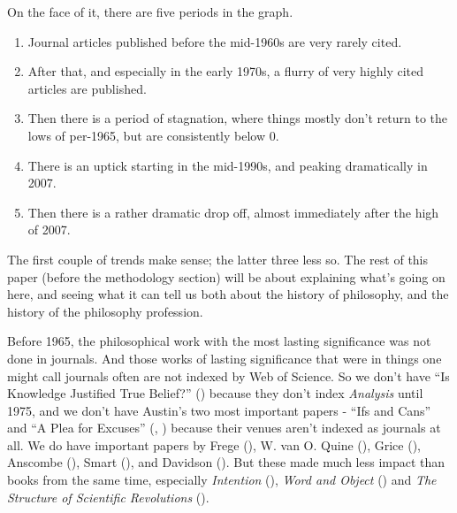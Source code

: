 \documentclass[
  12pt,
  letterpaper,
  DIV=11,
  numbers=noendperiod]{scrartcl}
\providecommand{\tightlist}{%
  \setlength{\itemsep}{0pt}\setlength{\parskip}{0pt}}
\begin{document}
On the face of it, there are five periods in the graph.

\begin{enumerate}
\def\labelenumi{\arabic{enumi}.}
\tightlist
\item
  Journal articles published before the mid-1960s are very rarely cited.
\item
  After that, and especially in the early 1970s, a flurry of very highly
  cited articles are published.
\item
  Then there is a period of stagnation, where things mostly don't return
  to the lows of per-1965, but are consistently below 0.
\item
  There is an uptick starting in the mid-1990s, and peaking dramatically
  in 2007.
\item
  Then there is a rather dramatic drop off, almost immediately after the
  high of 2007.
\end{enumerate}

The first couple of trends make sense; the latter three less so. The
rest of this paper (before the methodology section) will be about
explaining what's going on here, and seeing what it can tell us both
about the history of philosophy, and the history of the philosophy
profession.

Before 1965, the philosophical work with the most lasting significance
was not done in journals. And those works of lasting significance that
were in things one might call journals often are not indexed by Web of
Science. So we don't have ``Is Knowledge Justified True Belief?''
() because they don't index
\emph{Analysis} until 1975, and we don't have Austin's two most
important papers - ``Ifs and Cans'' and ``A Plea for Excuses''
(,
) because their venues aren't indexed
as journals at all. We do have important papers by Frege
(), W. van O. Quine
(), Grice
(), Anscombe
(), Smart
(), and Davidson
(). But these made much less
impact than books from the same time, especially \emph{Intention}
(), \emph{Word and Object}
() and \emph{The Structure
of Scientific Revolutions} ().
\end{document}
